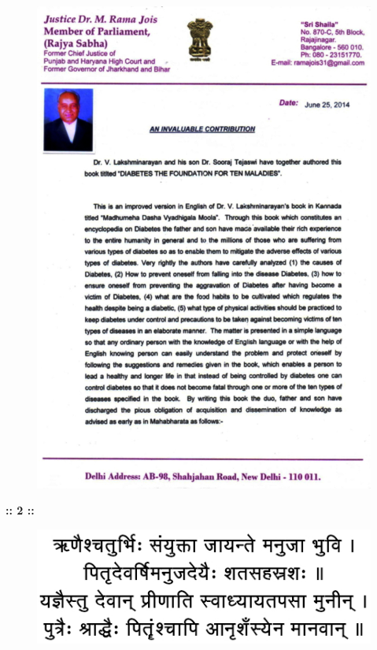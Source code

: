 \thispagestyle{empty}


\begin{figure}[h]
\centering
\includegraphics[scale=2.1]{images/002.jpg}
\end{figure}

\newpage

\begin{center}
\textbf{:: 2 ::}
\end{center}

\begin{figure}[h]
\centering
\includegraphics[scale=2.5]{images/002a.jpg}
\end{figure}

